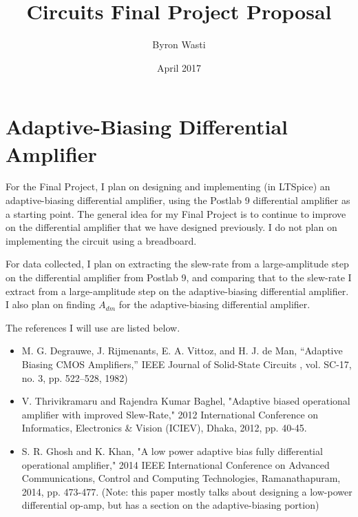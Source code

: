 \documentclass{article}
\title{Circuits Final Project Proposal}
\author{Byron Wasti}
\date{April 2017}
\begin{document}
\maketitle

\section{Adaptive-Biasing Differential Amplifier}

For the Final Project, I plan on designing and implementing (in LTSpice) an adaptive-biasing differential amplifier, using the Postlab 9 differential amplifier as a starting point. The general idea for my Final Project is to continue to improve on the differential amplifier that we have designed previously. I do not plan on implementing the circuit using a breadboard.

For data collected, I plan on extracting the slew-rate from a large-amplitude step on the differential amplifier from Postlab 9, and comparing that to the slew-rate I extract from a large-amplitude step on the adaptive-biasing differential amplifier. I also plan on finding $A_{dm}$ for the adaptive-biasing differential amplifier.

The references I will use are listed below.

\begin{itemize}

    \item  M.  G.  Degrauwe,  J.  Rijmenants, E. A. Vittoz, and H. J. de Man, “Adaptive Biasing CMOS Amplifiers,” IEEE Journal of Solid-State Circuits , vol. SC-17, no. 3, pp. 522–528, 1982)

    \item  V. Thrivikramaru and Rajendra Kumar Baghel, "Adaptive biased operational amplifier with improved Slew-Rate," 2012 International Conference on Informatics, Electronics \& Vision (ICIEV), Dhaka, 2012, pp. 40-45.

    \item  S. R. Ghosh and K. Khan, "A low power adaptive bias fully differential operational amplifier," 2014 IEEE International Conference on Advanced Communications, Control and Computing Technologies, Ramanathapuram, 2014, pp. 473-477.  (Note: this paper mostly talks about designing a low-power differential op-amp, but has a section on the adaptive-biasing portion)
        
\end{itemize}
\end{document}
